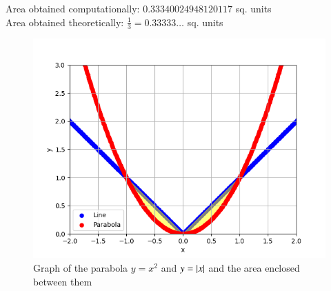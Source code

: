 \documentclass[journal]{IEEEtran}
\begin{document}
Area obtained computationally: $0.33340024948120117$ sq. units\\
Area obtained theoretically: $\frac{1}{3}=0.33333\dots$ sq. units
\begin{figure}[h!]
   \centering
   \includegraphics[width=1\columnwidth]{figs/fig.png}
   \caption{Graph of the parabola $y=x^2$ and $y=\left\vert x\right\vert$ and the area enclosed between them}
   \label{stemplot}
\end{figure}
\end{document}

